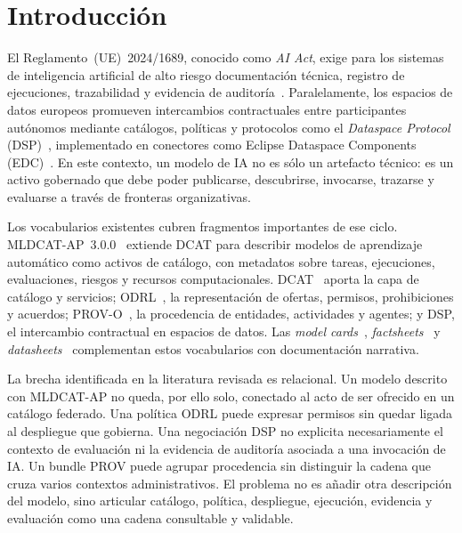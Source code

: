 \documentclass[Afour,sagev,times]{sagej}
\begin{document}
\maketitle

\section{Introducción}\label{sec:intro}

El Reglamento~(UE)~2024/1689, conocido como \emph{AI Act}, exige para los sistemas de inteligencia artificial de alto riesgo documentación técnica, registro de ejecuciones, trazabilidad y evidencia de auditoría~\cite{aiact}. Paralelamente, los espacios de datos europeos promueven intercambios contractuales entre participantes autónomos mediante catálogos, políticas y protocolos como el \emph{Dataspace Protocol} (DSP)~\cite{dsp}, implementado en conectores como Eclipse Dataspace Components (EDC)~\cite{edc}. En este contexto, un modelo de IA no es sólo un artefacto técnico: es un activo gobernado que debe poder publicarse, descubrirse, invocarse, trazarse y evaluarse a través de fronteras organizativas.

Los vocabularios existentes cubren fragmentos importantes de ese ciclo. MLDCAT-AP~3.0.0~\cite{mldcatap} extiende DCAT para describir modelos de aprendizaje automático como activos de catálogo, con metadatos sobre tareas, ejecuciones, evaluaciones, riesgos y recursos computacionales. DCAT~\cite{dcat2} aporta la capa de catálogo y servicios; ODRL~\cite{odrl22}, la representación de ofertas, permisos, prohibiciones y acuerdos; PROV-O~\cite{provo}, la procedencia de entidades, actividades y agentes; y DSP, el intercambio contractual en espacios de datos. Las \emph{model cards}~\cite{mitchell19}, \emph{factsheets}~\cite{arnold19} y \emph{datasheets}~\cite{gebru21} complementan estos vocabularios con documentación narrativa.

La brecha identificada en la literatura revisada es relacional. Un modelo descrito con MLDCAT-AP no queda, por ello solo, conectado al acto de ser ofrecido en un catálogo federado. Una política ODRL puede expresar permisos sin quedar ligada al despliegue que gobierna. Una negociación DSP no explicita necesariamente el contexto de evaluación ni la evidencia de auditoría asociada a una invocación de IA. Un bundle PROV puede agrupar procedencia sin distinguir la cadena que cruza varios contextos administrativos. El problema no es añadir otra descripción del modelo, sino articular catálogo, política, despliegue, ejecución, evidencia y evaluación como una cadena consultable y validable.
\end{document}
